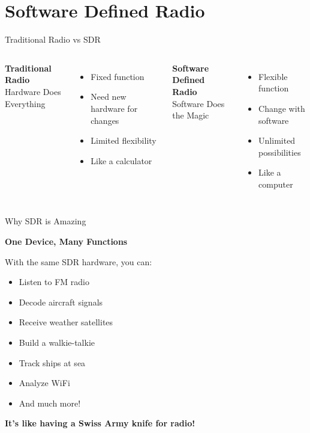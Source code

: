 \documentclass[aspectratio=169,12pt]{beamer}
\begin{document}
\section{Software Defined Radio}

\begin{frame}{Traditional Radio vs SDR}
\begin{columns}
\begin{center}
\textbf{\Large Traditional Radio}\\
\textcolor{radiogray}{Hardware Does Everything}
\end{center}
\begin{itemize}
    \item Fixed function
    \item Need new hardware for changes
    \item Limited flexibility
    \item Like a calculator
\end{itemize}

\begin{center}
\textbf{\Large Software Defined Radio}\\
\textcolor{radioblue}{Software Does the Magic}
\end{center}
\begin{itemize}
    \item Flexible function
    \item Change with software
    \item Unlimited possibilities
    \item Like a computer
\end{itemize}
\end{columns}
\end{frame}

\begin{frame}{Why SDR is Amazing}
\begin{center}
\Large\textbf{One Device, Many Functions}
\end{center}
\vspace{1em}

With the same SDR hardware, you can:
\begin{itemize}
    \item Listen to FM radio
    \item Decode aircraft signals
    \item Receive weather satellites
    \item Build a walkie-talkie
    \item Track ships at sea
    \item Analyze WiFi
    \item And much more!
\end{itemize}

\vspace{1em}
\begin{center}
\colorbox{radiogreen!20}{\parbox{0.8\textwidth}{\centering
\textbf{It's like having a Swiss Army knife for radio!}}}
\end{center}
\end{frame}
\end{document}
